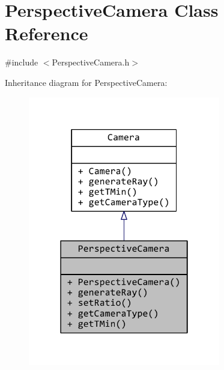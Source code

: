 \hypertarget{classPerspectiveCamera}{\section{Perspective\+Camera Class Reference}
\label{classPerspectiveCamera}
}


{\ttfamily \#include $<$Perspective\+Camera.\+h$>$}



Inheritance diagram for Perspective\+Camera\+:
\nopagebreak
\begin{figure}[H]
\begin{center}
\leavevmode
\includegraphics[width=238pt]{classPerspectiveCamera__inherit__graph}
\end{center}
\end{figure}


